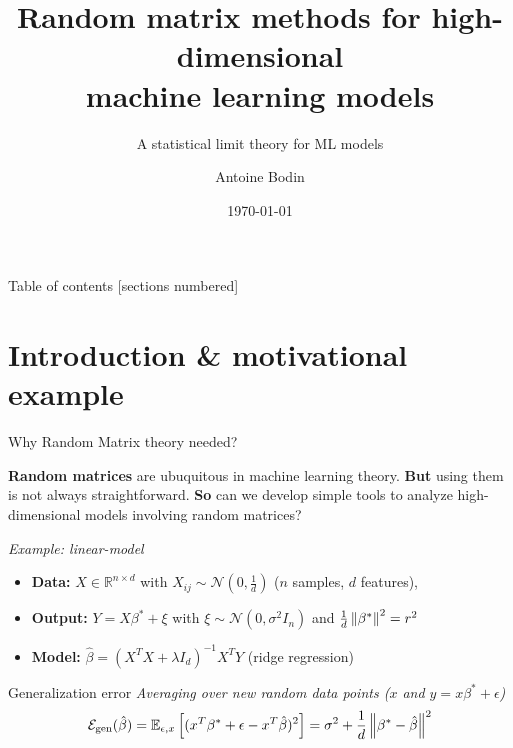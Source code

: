 \documentclass[10pt]{beamer}
\title{Random matrix methods for high-dimensional\\ machine learning models}
\subtitle{A statistical limit theory for ML models}
\date{\today}
\author{Antoine Bodin}
\institute{EPFL}
\begin{document}
\maketitle

\begin{frame}{Table of contents}
  [sections numbered]
  \tableofcontents[hideallsubsections]
\end{frame}

\section{Introduction \& motivational example}


\begin{frame}{Why Random Matrix theory needed?}
  \begin{alertblock}{}
    \textbf{Random matrices} are ubuquitous in machine learning theory.
    \textbf{But} using them is not always straightforward.
    \textbf{So} can we develop simple tools to analyze high-dimensional models involving random matrices?
  \end{alertblock}
  \emph{Example: linear-model}
  \begin{itemize}
    \item \textbf{Data:} $X \in \mathbb R^{n \times d}$ with $X_{ij} \sim \mathcal N(0, \frac{1}{d})$ ($n$ samples, $d$ features), 
    \item \textbf{Output:} $Y = X \beta^* + \xi$ with $\xi \sim \mathcal N(0, \sigma^2 I_n)$ and $ \frac{1}{d}\left\lVert\beta^*\right\rVert^2 = r^2$
    \item \textbf{Model:} $\hat \beta = (X^T X + \lambda I_d)^{-1} X^T Y$ (ridge regression)
  \end{itemize}

  
  \vspace{0.4cm}
  \begin{alertblock}{Generalization error}
    \emph{Averaging over new random data points ($x$ and $y=x\beta^* + \epsilon$)}
  \begin{equation*}
    \mathcal E_{\text{gen}}(\hat \beta)  = \mathbb E_{\epsilon, x} \left[ ( x^T \beta^* + \epsilon - x^T \hat \beta )^2 \right] 
    = \sigma^2 + \frac{1}{d} \left\lVert\beta^* - \hat \beta\right\rVert^2
  \end{equation*}
  \end{alertblock}

\end{frame}
\end{document}
